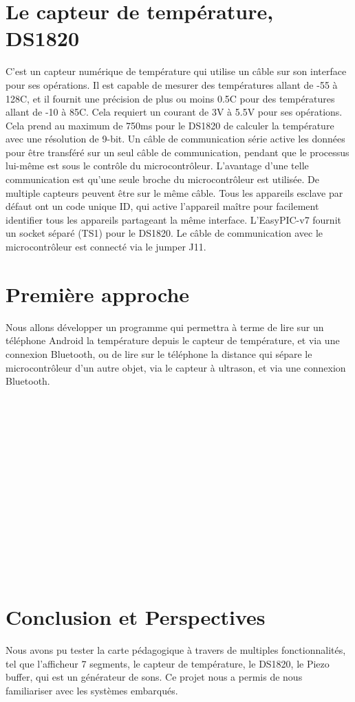 \documentclass[a4paper, 12pt]{book}
\newcounter{program}[subsection]
\begin{document}
\chapter{Le capteur de température, DS1820}
C’est un capteur numérique de température qui utilise un câble sur son interface pour ses opérations. Il est capable de mesurer des températures allant de -55 à 128C, et il fournit une précision de plus ou moins 0.5C pour des températures allant de -10 à 85C. Cela requiert un courant de 3V à 5.5V pour ses opérations. Cela prend au maximum de 750ms pour le DS1820 de calculer la température avec une résolution de 9-bit.
Un câble de communication série active les données pour être transféré sur un seul câble de communication, pendant que le processus lui-même est sous le contrôle du microcontrôleur. L’avantage d’une telle communication est qu’une seule broche du microcontrôleur est utilisée. De multiple capteurs peuvent être sur le même câble. Tous les appareils esclave par défaut ont un code unique ID, qui active l’appareil maître pour facilement identifier tous les appareils partageant la même interface. L’EasyPIC-v7 fournit un socket séparé (TS1) pour le DS1820. Le câble de communication avec le microcontrôleur est connecté via le jumper J11.


\chapter{Première approche}
Nous allons développer un programme qui permettra à terme de lire sur un téléphone Android la température depuis le capteur de température, et via une connexion Bluetooth, 
ou de lire sur le téléphone la distance qui sépare le microcontrôleur d'un autre objet, via le capteur à ultrason, et via une connexion Bluetooth.\\\\\\\\\\\\\\\\\\\\\\\\\\\\\\

\cite{redbook}

\chapter{Conclusion et Perspectives\label{chap-conclusion}}
Nous avons pu tester la carte pédagogique à travers de multiples fonctionnalités, tel que l'afficheur 7 segments, le capteur de température, le DS1820, le Piezo buffer, qui est un générateur de sons. 
Ce projet nous a permis de nous familiariser avec les systèmes embarqués.
\end{document}
